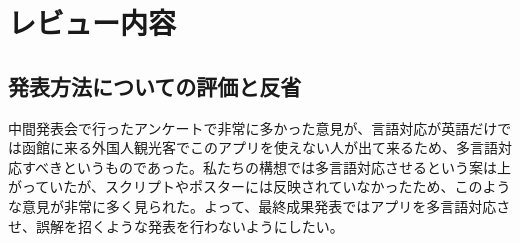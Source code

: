 \documentclass[11pt,papersize]{jsbook}
\begin{document}
\section{レビュー内容}

\subsection{発表方法についての評価と反省}
 中間発表会で行ったアンケートで非常に多かった意見が、言語対応が英語だけでは函館に来る外国人観光客でこのアプリを使えない人が出て来るため、多言語対応すべきというものであった。私たちの構想では多言語対応させるという案は上がっていたが、スクリプトやポスターには反映されていなかったため、このような意見が非常に多く見られた。よって、最終成果発表ではアプリを多言語対応させ、誤解を招くような発表を行わないようにしたい。
\end{document}
